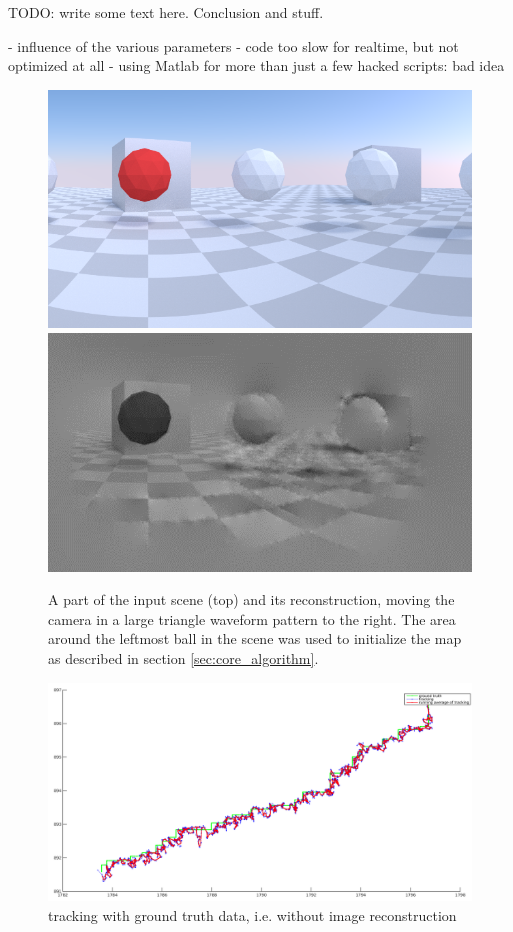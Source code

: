 TODO: write some text here. Conclusion and stuff.

- influence of the various parameters
- code too slow for realtime, but not optimized at all
- using Matlab for more than just a few hacked scripts: bad idea

\begin{figure}
\includegraphics[width=\columnwidth]{images/zigzag_input.png}
\includegraphics[width=\columnwidth]{images/zigzag_reconstruction.png}
\caption{A part of the input scene (top) and its reconstruction,
moving the camera in a large triangle waveform pattern to the right.
The area around the leftmost ball in the scene was used to initialize
the map as described in section \ref{sec:core_algorithm}.}
\label{fig:zigzag_reconstruction}
\end{figure}

\begin{figure}
\includegraphics[width=\columnwidth]{images/tracking_without_reconstruction.png}
\caption{tracking with ground truth data, i.e. without image reconstruction}
\label{fig:tracking_groundtruth}
\end{figure}
